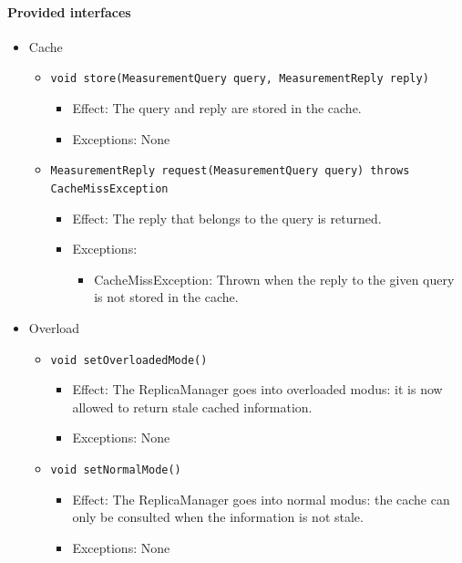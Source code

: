 \documentclass[a4paper,10pt]{article}
\begin{document}
\paragraph{Provided interfaces}
\begin{itemize}
    \item Cache
    \begin{itemize}
        \item \texttt{void store(MeasurementQuery query, MeasurementReply reply)}
        \begin{itemize}
            \item Effect: The query and reply are stored in the cache.
            \item Exceptions: None
		\end{itemize}
        \item \texttt{MeasurementReply request(MeasurementQuery query) throws CacheMissException}
        \begin{itemize}
            \item Effect: The reply that belongs to the query is returned.
            \item Exceptions:
            \begin{itemize}
                \item CacheMissException: Thrown when the reply to the given query is not stored in the cache.
            \end{itemize}
		\end{itemize}
    \end{itemize}

    \item Overload
    \begin{itemize}
        \item \texttt{void setOverloadedMode()}
        \begin{itemize}
            \item Effect: The ReplicaManager goes into overloaded modus: it is now allowed to return stale cached information.
            \item Exceptions: None
        \end{itemize}
        \item \texttt{void setNormalMode()}
        \begin{itemize}
            \item Effect: The ReplicaManager goes into normal modus: the cache can only be consulted when the information is not stale.
            \item Exceptions: None
        \end{itemize}
    \end{itemize}
\end{itemize}
\end{document}
